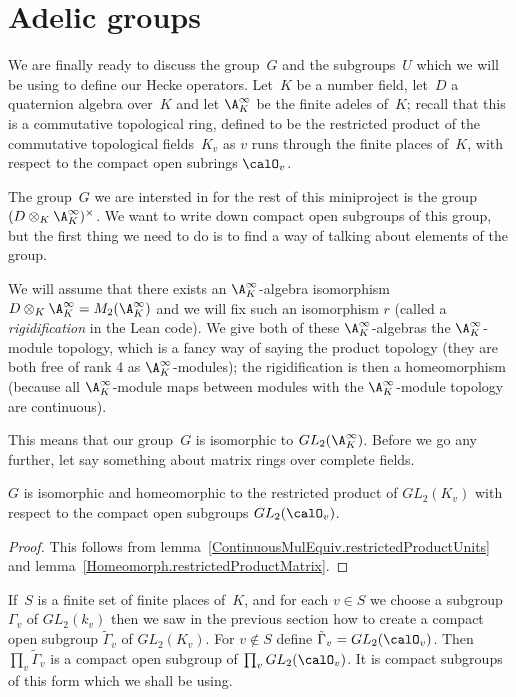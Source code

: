 \section{Adelic groups}

We are finally ready to discuss the group~$G$ and the subgroups~$U$ which we will be
using to define our Hecke operators. Let~$K$ be a number field, let~$D$ a quaternion algebra
over~$K$ and let $\A_K^\infty$ be the finite adeles of~$K$; recall that this is a commutative
topological ring, defined to be the restricted
product of the commutative topological fields~$K_v$ as $v$ runs through the finite places
of~$K$, with respect to the compact open subrings $\calO_v$.

The group~$G$ we are intersted in for the rest of this miniproject is the group
$(D\otimes_K\A_K^\infty)^\times$. We want to write down compact open subgroups of this group,
but the first thing we need to do is to find a way of talking about elements of the group.

We will assume that there exists an $\A_K^\infty$-algebra isomorphism
$D\otimes_K\A_K^\infty=M_2(\A_K^\infty)$ and we will fix such an isomorphism $r$
(called a \emph{rigidification} in the Lean code). We give both of these $\A_K^\infty$-algebras
the $\A_K^\infty$-module topology, which is a fancy way of saying the product topology
(they are both free of rank 4 as $\A_K^\infty$-modules); the rigidification is then
a homeomorphism (because all $\A_K^\infty$-module maps between modules with the $\A_K^\infty$-module
topology are continuous).

This means that our group~$G$ is isomorphic to $GL_2(\A_K^\infty)$. Before we go any further,
let say something about matrix rings over complete fields.

\begin{theorem} $G$ is isomorphic and homeomorphic
  to the restricted product of $GL_2(K_v)$ with respect
  to the compact open subgroups $GL_2(\calO_v)$.
\end{theorem}
\begin{proof} This follows from lemma~\ref{ContinuousMulEquiv.restrictedProductUnits}
  and lemma~\ref{Homeomorph.restrictedProductMatrix}.
\end{proof}

If~$S$ is a finite set of finite places of~$K$, and for each $v\in S$ we choose
a subgroup $\Gamma_v$ of $GL_2(k_v)$ then we saw in the previous section how to
create a compact open subgroup $\tilde{\Gamma}_v$ of $GL_2(K_v)$. For $v\notin S$
define $\tilde{\Gamma}_v=GL_2(\calO_v)$. Then $\prod_v\tilde{\Gamma}_v$ is a compact
open subgroup of $\prod_vGL_2(\calO_v)$. It is compact subgroups of this form
which we shall be using.

